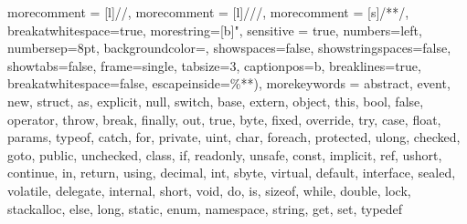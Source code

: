 \newcommand{\pdf}{PDF}


\newcommand{\figref}[1]{Figure \ref{#1}}

\newcommand{\mgd}[2]{\ensuremath{\{ #1 \mid #2 \}}}

\newtheorem{definition}{Definition}
{
	morecomment = [l]{//},
	morecomment = [l]{///},
	morecomment = [s]{/*}{*/},
	breakatwhitespace=true, 
	morestring=[b]",
	sensitive = true,
	numbers=left,                   %
	numbersep=8pt,                  %
	backgroundcolor=\color{white},  %
	showspaces=false,               %
	showstringspaces=false,         %
	showtabs=false,                 %
	frame=single,           		%
	tabsize=3,          			%
	captionpos=b,          			%
	breaklines=true,        		%
	breakatwhitespace=false,    	%
	escapeinside={\%*}{*)},
	morekeywords = {abstract,  event,  new,  struct,
		as,  explicit,  null,  switch,
		base,  extern,  object,  this,
		bool,  false,  operator,  throw,
		break,  finally,  out,  true,
		byte,  fixed,  override,  try,
		case,  float,  params,  typeof,
		catch,  for,  private,  uint,
		char,  foreach,  protected,  ulong,
		checked,  goto,  public,  unchecked,
		class,  if,  readonly,  unsafe,
		const,  implicit,  ref,  ushort,
		continue,  in,  return,  using,
		decimal,  int,  sbyte,  virtual,
		default,  interface,  sealed,  volatile,
		delegate,  internal,  short,  void,
		do,  is,  sizeof,  while,
		double,  lock,  stackalloc,
		else,  long,  static,
		enum,  namespace,  string, get, set, typedef }
}
